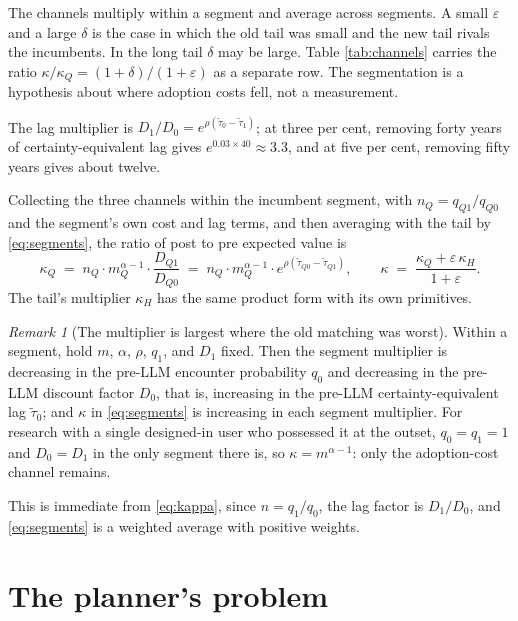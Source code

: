 \documentclass[11pt]{article}
\theoremstyle{definition}
\theoremstyle{remark}
\newtheorem{remark}{Remark}
\begin{document}
The channels multiply within a segment and average across segments. A small $\varepsilon$ and a large $\delta$ is the case in which the old tail was small and the new tail rivals the incumbents. In the long tail $\delta$ may be large. Table \ref{tab:channels} carries the ratio $\kappa / \kappa_Q = (1+\delta)/(1+\varepsilon)$ as a separate row. The segmentation is a hypothesis about where adoption costs fell, not a measurement.

The lag multiplier is $D_1 / D_0 = e^{\rho(\tilde\tau_0 - \tilde\tau_1)}$; at three per cent, removing forty years of certainty-equivalent lag gives $e^{0.03 \times 40} \approx 3.3$, and at five per cent, removing fifty years gives about twelve.

Collecting the three channels within the incumbent segment, with $n_Q = q_{Q1}/q_{Q0}$ and the segment's own cost and lag terms, and then averaging with the tail by \eqref{eq:segments}, the ratio of post to pre expected value is
\begin{equation}
\kappa_Q \;=\; n_Q \cdot m_Q^{\alpha - 1} \cdot \frac{D_{Q1}}{D_{Q0}} \;=\; n_Q \cdot m_Q^{\alpha - 1} \cdot e^{\rho(\tilde\tau_{Q0} - \tilde\tau_{Q1})},
\qquad
\kappa \;=\; \frac{\kappa_Q + \varepsilon\,\kappa_H}{1 + \varepsilon}.
\label{eq:kappa}
\end{equation}
The tail's multiplier $\kappa_H$ has the same product form with its own primitives.

\begin{remark}[The multiplier is largest where the old matching was worst]
Within a segment, hold $m$, $\alpha$, $\rho$, $q_1$, and $D_1$ fixed. Then the segment multiplier is decreasing in the pre-LLM encounter probability $q_0$ and decreasing in the pre-LLM discount factor $D_0$, that is, increasing in the pre-LLM certainty-equivalent lag $\tilde\tau_0$; and $\kappa$ in \eqref{eq:segments} is increasing in each segment multiplier. For research with a single designed-in user who possessed it at the outset, $q_0 = q_1 = 1$ and $D_0 = D_1$ in the only segment there is, so $\kappa = m^{\alpha-1}$: only the adoption-cost channel remains.
\end{remark}

This is immediate from \eqref{eq:kappa}, since $n = q_1/q_0$, the lag factor is $D_1 / D_0$, and \eqref{eq:segments} is a weighted average with positive weights.

\section{The planner's problem}
\end{document}
